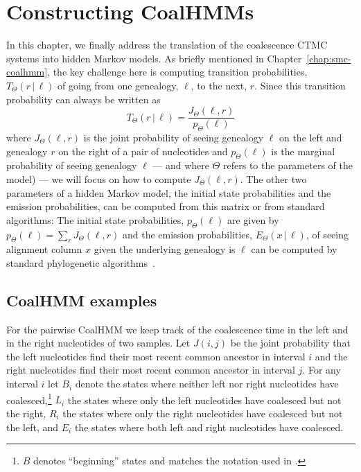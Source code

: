 \chapter{Constructing CoalHMMs}
\label{chap:constructing-coalhmms}

In this chapter, we finally address the translation of the coalescence CTMC systems into hidden Markov models. As briefly mentioned in Chapter~\ref{chap:smc-coalhmm}, the key challenge here is computing transition probabilities, $T_\Theta(r\,|\,\ell)$ of going from one genealogy, $\ell$, to the next, $r$. Since this transition probability can always be written as
\[
	T_\Theta(r\,|\,\ell) =
	\frac{J_\Theta(\ell,r)}{p_\Theta(\ell)}
\]
where $J_\Theta(\ell,r)$ is the joint probability of seeing genealogy $\ell$ on the left and genealogy $r$ on the right of a pair of nucleotides and $p_\Theta(\ell)$ is the marginal probability of seeing genealogy $\ell$ --- and where $\Theta$ refers to the parameters of the model) --- we will focus on how to compute $J_\Theta(\ell,r)$. The other two parameters of a hidden Markov model, the initial state probabilities and the emission probabilities, can be computed from this matrix or from standard algorithms: The initial state probabilities, $p_\Theta(\ell)$ are given by $p_\Theta(\ell) = \sum_r J_\Theta(\ell,r)$ and the emission probabilities, $E_\Theta(x\,|\,\ell)$, of seeing alignment column $x$ given the underlying genealogy is $\ell$ can be computed by standard phylogenetic algorithms~\cite{Felsenstein_1981}.


\section{CoalHMM examples}

For the pairwise CoalHMM we keep track of the coalescence time in the left and in the right nucleotides of two samples. Let $J(i,j)$ be the joint probability that the left nucleotides find their most recent common ancestor in interval $i$ and the right nucleotides find their most recent common ancestor in interval $j$. For any interval $i$ let $B_i$ denote the states where neither left nor right nucleotides have coalesced,\footnote{$B$ denotes ``beginning'' states and matches the notation used in \citet{Mailund:2011dv,Mailund:2012ew}.} $L_i$ the states where only the left nucleotides have coalesced but not the right, $R_i$ the states where only the right nucleotides have coalesced but not the left, and $E_i$ the states where both left and right nucleotides have coalesced.

